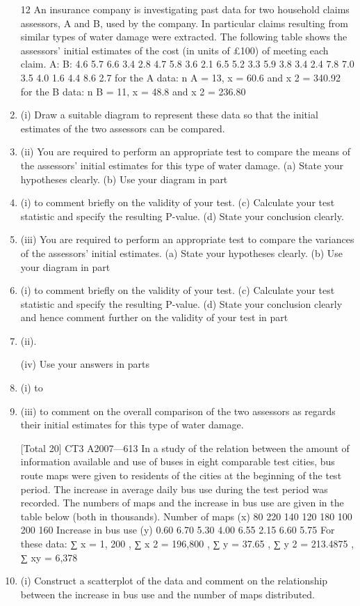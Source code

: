 \documentclass[a4paper,12pt]{article}
\begin{document}
\begin{enumerate}


12
An insurance company is investigating past data for two household claims assessors,
A and B, used by the company. In particular claims resulting from similar types of
water damage were extracted. The following table shows the assessors’ initial
estimates of the cost (in units of £100) of meeting each claim.
A:
B:
4.6
5.7
6.6
3.4
2.8
4.7
5.8
3.6
2.1
6.5
5.2
3.3
5.9
3.8
3.4
2.4
7.8
7.0
3.5
4.0
1.6
4.4
8.6
2.7
for the A data: n A = 13, \sum x = 60.6 and \sum x 2 = 340.92
for the B data: n B = 11, \sum x = 48.8 and \sum x 2 = 236.80
\item (i) Draw a suitable diagram to represent these data so that the initial estimates of
the two assessors can be compared.

\item (ii) You are required to perform an appropriate test to compare the means of the
assessors’ initial estimates for this type of water damage.
(a) State your hypotheses clearly.
(b) Use your diagram in part \item (i) to comment briefly on the validity of your
test.
(c) Calculate your test statistic and specify the resulting P-value.
(d) State your conclusion clearly.
\item (iii)
You are required to perform an appropriate test to compare the variances of
the assessors’ initial estimates.
(a) State your hypotheses clearly.
(b) Use your diagram in part \item (i) to comment briefly on the validity of your
test.
(c) Calculate your test statistic and specify the resulting P-value.
(d) State your conclusion clearly and hence comment further on the validity of your test in part \item (ii).

(iv)
Use your answers in parts \item (i) to \item (iii) to comment on the overall comparison of the two assessors as regards their initial estimates for this type of water damage.

[Total 20]
CT3 A2007—613
In a study of the relation between the amount of information available and use of
buses in eight comparable test cities, bus route maps were given to residents of the cities at the beginning of the test period. The increase in average daily bus use during the test period was recorded. The numbers of maps and the increase in bus use are
given in the table below (both in thousands).
Number of maps (x)
80 220 140 120 180 100 200 160
Increase in bus use (y) 0.60 6.70 5.30 4.00 6.55 2.15 6.60 5.75
For these data:
∑ x = 1, 200 , ∑ x 2 = 196,800 , ∑ y = 37.65 , ∑ y 2 = 213.4875 , ∑ xy = 6,378
\item (i) Construct a scatterplot of the data and comment on the relationship between
the increase in bus use and the number of maps distributed.


\end{enumerate}
\end{document}
